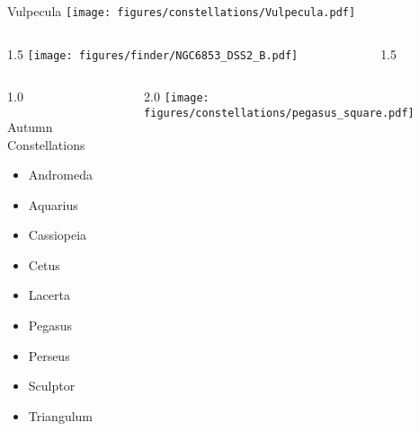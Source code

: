 \documentclass[final]{beamer}
\newlength{\colwidth}
\begin{document}

\begin{frame}[t]{\LARGE Vulpecula}
    \centering
    \texttt{[image: figures/constellations/Vulpecula.pdf]}
\end{frame}


\begin{frame}[t]{}
    \begin{columns}[T]
        \begin{column}{1.5\colwidth}
            \centering
            \texttt{[image: figures/finder/NGC6853\_DSS2\_B.pdf]}
        \end{column}
        \begin{column}{1.5\colwidth}
            \Large
            
        \end{column}
    \end{columns}
    \vspace{\fill}
\end{frame}

\begin{frame}[t]{}
    \begin{columns}[T]
        \begin{column}{1.0\colwidth}
            \Large
            \begin{block}{Autumn Constellations}
                \begin{itemize}
                    \item{Andromeda}
                    \item{Aquarius}
                    \item{Cassiopeia}
                    \item{Cetus}
                    \item{Lacerta}
                    \item{Pegasus}
                    \item{Perseus}
                    \item{Sculptor}
                    \item{Triangulum}
                \end{itemize}
            \end{block}
        \end{column}
        \begin{column}{2.0\colwidth}
            \centering
            \texttt{[image: figures/constellations/pegasus\_square.pdf]}
        \end{column}
    \end{columns}
\end{frame}
\end{document}
